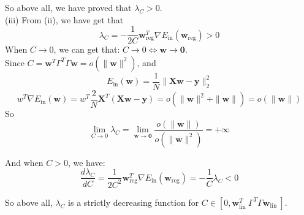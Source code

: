 So above all, we have proved that $\lambda_C>0$.\\

(iii) From (ii), we have get that
$$\lambda_C = -\frac{1}{2C}\mathbf{w}_{\text{reg}}^T\nabla E_{\text{in}}(\mathbf{w}_{\text{reg}})>0$$
When $C\to 0$, we can get that:
$C\to 0\Leftrightarrow\mathbf{w}\to \mathbf{0}$.\\
Since $C=\mathbf{w}^T\Gamma^{T}\Gamma\mathbf{w}=o(\|\mathbf{w}\|^2)$, and 
$$E_\text{in}(\mathbf{w})=\frac{1}{N}\|\mathbf{Xw}-\mathbf{y}\|_2^2$$
$$w^T\nabla E_{\text{in}}(\mathbf{w})=w^T\frac{2}{N}\mathbf{X}^T(\mathbf{Xw}-\mathbf{y})=o(\|\mathbf{w}\|^2+\|\mathbf{w}\|)=o(\|\mathbf{w}\|)$$
So
$$\lim_{C\to 0}\lambda_C=\lim_{\mathbf{w}\to \mathbf{0}}\dfrac{o(\|\mathbf{w}\|)}{o(\|\mathbf{w}\|^2)}=+\infty$$

And when $C>0$, we have:
$$\frac{d\lambda_C}{dC} = \frac{1}{2C^2}\mathbf{w}_{\text{reg}}^T\nabla E_{\text{in}}(\mathbf{w}_{\text{reg}})=-\dfrac{1}{C}\lambda_C < 0$$

So above all, $\lambda_C$ is a strictly decreasing function for $C \in\left[0, \mathbf{w}_{\text {lin }}^T \Gamma^T \Gamma \mathbf{w}_{\text {lin }}\right]$.

\newpage